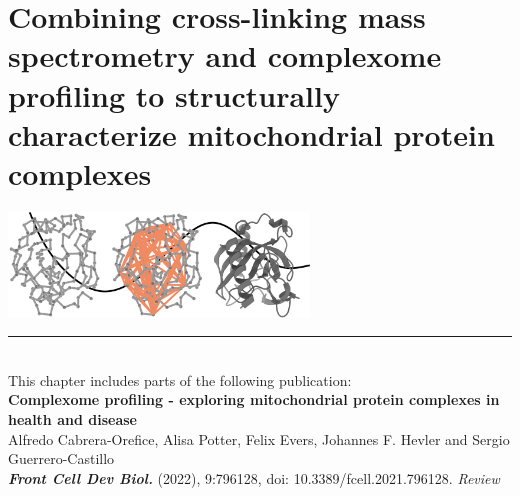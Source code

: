 \chapter{\large Combining cross-linking mass spectrometry and complexome profiling to structurally characterize mitochondrial protein complexes} \label{ch-1}

{
\begin{center}
\vspace{0.75cm}        
\footnotesize
\includegraphics[width=0.6\textwidth]{Chapter.1/Figures/chapter1_cover.png}
\end{center} 
}

\begin{flushleft}
\vspace*{\fill}    
\rule{\textwidth}{1pt}\\[0cm]
This chapter includes parts of the following publication:\\
\textbf{Complexome profiling - exploring mitochondrial protein complexes in health and disease}\\
\footnotesize
\vspace{0.3cm}
Alfredo Cabrera-Orefice, Alisa Potter, Felix Evers, Johannes F. Hevler and Sergio Guerrero-Castillo \\
\textbf{\emph{Front Cell Dev Biol.}} (2022), 9:796128, doi: 10.3389/fcell.2021.796128. \emph{Review}\\
\end{flushleft}
\newpage

